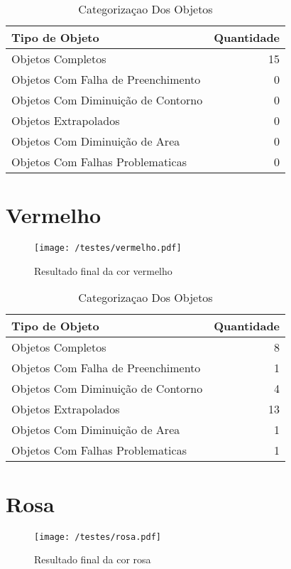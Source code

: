 \begin{table}[h]
\centering
\begin{tabular}{l|r}
Tipo de Objeto & Quantidade \\ %
\hline                               %
Objetos Completos &  15\\
\hline 
Objetos Com Falha de Preenchimento & 0\\
\hline 
Objetos Com Diminuição de Contorno &  0\\
\hline 
Objetos Extrapolados & 0 \\
\hline 
Objetos Com Diminuição de Area &  0 \\
\hline 
Objetos Com Falhas Problematicas & 0 \\
\hline 
\end{tabular}
\caption{Categorizaçao Dos Objetos}
\end{table}	
	
\section{Vermelho}
	\begin{figure}[H]
		\centering
		\texttt{[image: /testes/vermelho.pdf]}
		\caption{Resultado final da cor vermelho}
		\label{disposicaoparte}
	\end{figure}
	
	\begin{table}[h]
\centering
\begin{tabular}{l|r}
Tipo de Objeto & Quantidade \\ %
\hline                               %
Objetos Completos &  8 \\
\hline 
Objetos Com Falha de Preenchimento & 1 \\
\hline 
Objetos Com Diminuição de Contorno &  4\\
\hline 
Objetos Extrapolados &  13 \\
\hline 
Objetos Com Diminuição de Area &  1\\
\hline 
Objetos Com Falhas Problematicas &  1\\
\hline 
\end{tabular}
\caption{Categorizaçao Dos Objetos}
\end{table}

\section{Rosa}
	\begin{figure}[H]
		\centering
		\texttt{[image: /testes/rosa.pdf]}
		\caption{Resultado final da cor rosa}
		\label{disposicaoparte}
	\end{figure}
	
